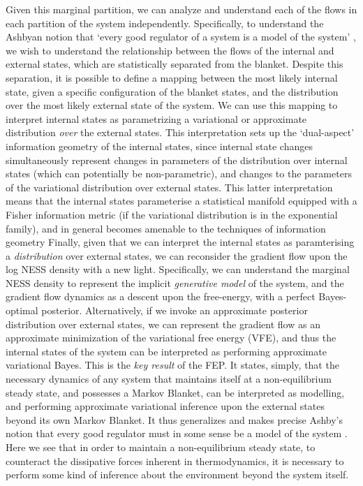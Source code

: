 Given this marginal partition, we can analyze and understand each of the flows in each partition of the system independently. Specifically, to understand the Ashbyan notion that `every good regulator of a system is a model of the system' , we wish to understand the relationship between the flows of the internal and external states, which are statistically separated from the blanket. Despite this separation, it is possible to define a mapping between the most likely internal state, given a specific configuration of the blanket states, and the distribution over the most likely external state of the system. We can use this mapping to interpret internal states as parametrizing a variational or approximate distribution \emph{over} the external states. This interpretation sets up the `dual-aspect' information geometry of the internal states, since internal state changes simultaneously represent changes in parameters of the distribution over internal states (which can potentially be non-parametric), and changes to the parameters of the variational distribution over external states. This latter interpretation means that the internal states parameterise a statistical manifold equipped with a Fisher information metric (if the variational distribution is in the exponential family), and in general becomes amenable to the techniques of information geometry \citep{amari1995information,ollivier2017information} Finally, given that we can interpret the internal states as paramterising a \emph{distribution} over external states, we can reconsider the gradient flow upon the log NESS density with a new light. Specifically, we can understand the marginal NESS density to represent the implicit \emph{generative model} of the system, and the gradient flow dynamics as a descent upon the free-energy, with a perfect Bayes-optimal posterior. Alternatively, if we invoke an approximate posterior distribution over external states, we can represent the gradient flow as an approximate minimization of the variational free energy (VFE), and thus the internal states of the system can be interpreted as performing approximate variational Bayes. This is the \emph{key result} of the FEP. It states, simply, that the necessary dynamics of any system that maintains itself at a non-equilibrium steady state, and possesses a Markov Blanket, can be interpreted as modelling, and performing approximate variational inference upon the external states beyond its own Markov Blanket. It thus generalizes and makes precise Ashby's notion that every good regulator must in some sense be a model of the system \citep{conant1970every}. Here we see that in order to maintain a non-equilibrium steady state, to counteract the dissipative forces inherent in thermodynamics, it is necessary to perform some kind of inference about the environment beyond the system itself. 

